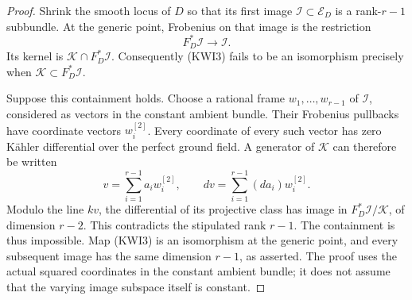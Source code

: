 \begin{proof}
Shrink the smooth locus of \(D\) so that its first image
\(\mathcal I\subset\mathcal E_D\) is a rank-\(r-1\) subbundle.
At the generic point, Frobenius on that image is the restriction
\[
             F_D^*\mathcal I\longrightarrow\mathcal I.
                                                        \tag{KWI3}
\]
Its kernel is \(\mathcal K\cap F_D^*\mathcal I\).  Consequently
(KWI3) fails to be an isomorphism precisely when
\(\mathcal K\subset F_D^*\mathcal I\).

Suppose this containment holds.  Choose a rational frame
\(w_1,\ldots,w_{r-1}\) of \(\mathcal I\), considered as vectors
in the constant ambient bundle.  Their Frobenius pullbacks have
coordinate vectors \(w_i^{[2]}\).  Every coordinate of every such
vector has zero K\"ahler differential over the perfect ground
field.  A generator of \(\mathcal K\) can therefore be written
\[
                   v=\sum_{i=1}^{r-1}a_iw_i^{[2]},
       \qquad dv=\sum_{i=1}^{r-1}(da_i)w_i^{[2]}.
                                                        \tag{KWI4}
\]
Modulo the line \(kv\), the differential of its projective class
has image in \(F_D^*\mathcal I/\mathcal K\), of dimension
\(r-2\).  This contradicts the stipulated rank \(r-1\).
The containment is thus impossible.  Map (KWI3) is an isomorphism
at the generic point, and every subsequent image has the same
dimension \(r-1\), as asserted.  The proof uses the actual squared
coordinates in the constant ambient bundle; it does not assume
that the varying image subspace itself is constant.
\end{proof}

